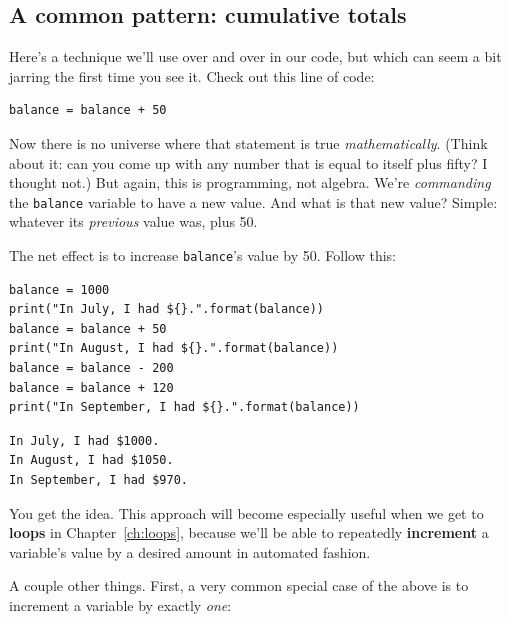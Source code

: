 \subsection{A common pattern: cumulative totals}

\label{cumulativeTotal}

Here's a technique we'll use over and over in our code, but which can seem a
bit jarring the first time you see it. Check out this line of code:

\begin{Verbatim}[fontsize=\small,samepage=true,frame=single,framesep=3mm]
balance = balance + 50
\end{Verbatim}

Now there is no universe where that statement is true \textit{mathematically}.
(Think about it: can you come up with any number that is equal to itself plus
fifty? I thought not.) But again, this is programming, not algebra. We're
\textit{commanding} the \texttt{balance} variable to have a new value. And what
is that new value? Simple: whatever its \textit{previous} value was, plus 50.

The net effect is to increase \texttt{balance}'s value by 50. Follow this:

\begin{Verbatim}[fontsize=\small,samepage=true,frame=single,framesep=3mm]
balance = 1000
print("In July, I had ${}.".format(balance))
balance = balance + 50
print("In August, I had ${}.".format(balance))
balance = balance - 200
balance = balance + 120
print("In September, I had ${}.".format(balance))
\end{Verbatim}
\vspace{-.2in}

\begin{Verbatim}[fontsize=\small,samepage=true,frame=leftline,framesep=5mm,framerule=1mm]
In July, I had $1000.
In August, I had $1050.
In September, I had $970.
\end{Verbatim}


You get the idea. This approach will become especially useful when we get to
\textbf{loops} in Chapter~\ref{ch:loops}, because we'll be able to repeatedly
\textbf{increment} a variable's value by a desired amount in automated fashion.

\medskip

A couple other things. First, a very common special case of the above is to
increment a variable by exactly \textit{one}:

